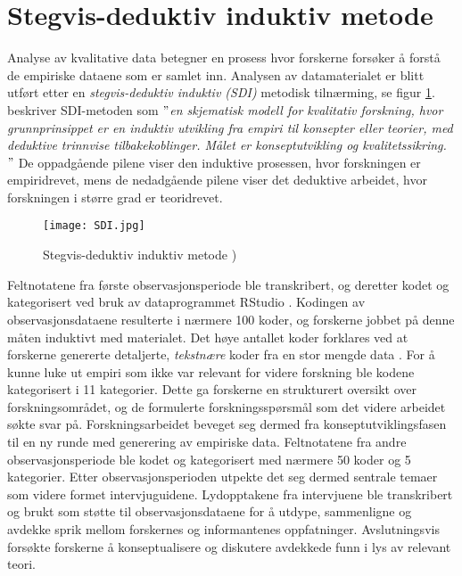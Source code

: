\section{Stegvis-deduktiv induktiv metode}
\label{section:sdi} 
Analyse av kvalitative data betegner en prosess hvor forskerne forsøker å forstå de empiriske dataene som er samlet inn. Analysen av datamaterialet er blitt utført etter en \textit{stegvis-deduktiv induktiv (SDI)} metodisk tilnærming, se figur \ref{SDI}. \citet{Tjora} beskriver SDI-metoden som \textit{$"$en skjematisk modell for kvalitativ forskning, hvor grunnprinsippet er en induktiv utvikling fra empiri til konsepter eller teorier, med deduktive trinnvise tilbakekoblinger. Målet er konseptutvikling og kvalitetssikring. $"$} De oppadgående pilene viser den induktive prosessen, hvor forskningen er empiridrevet, mens de nedadgående pilene viser det deduktive arbeidet, hvor forskningen i større grad er teoridrevet.

\begin{figure}[H]
\centering
\texttt{[image: SDI.jpg]}
\caption{Stegvis-deduktiv induktiv metode \citep{Tjora})}
\label{SDI}
\end{figure}

\noindent
Feltnotatene fra første observasjonsperiode ble transkribert, og deretter kodet og kategorisert ved bruk av dataprogrammet RStudio \citep{Rstudio}. Kodingen av observasjonsdataene resulterte i nærmere 100 koder, og forskerne jobbet på denne måten induktivt med materialet. Det høye antallet koder forklares ved at forskerne genererte detaljerte, \textit{tekstnære} koder fra en stor mengde data \citep{Tjora}. For å kunne luke ut empiri som ikke var relevant for videre forskning ble kodene kategorisert i 11 kategorier. Dette ga forskerne en strukturert oversikt over forskningsområdet, og de formulerte forskningsspørsmål som det videre arbeidet søkte svar på. Forskningsarbeidet beveget seg dermed fra konseptutviklingsfasen til en ny runde med generering av empiriske data. Feltnotatene fra andre observasjonsperiode ble kodet og kategorisert med nærmere 50 koder og 5 kategorier. Etter observasjonsperioden utpekte det seg dermed sentrale temaer som videre formet intervjuguidene. Lydopptakene fra intervjuene ble transkribert og brukt som støtte til observasjonsdataene for å utdype, sammenligne og avdekke sprik mellom forskernes og informantenes oppfatninger. Avslutningsvis forsøkte forskerne å konseptualisere og diskutere avdekkede funn i lys av relevant teori. 


